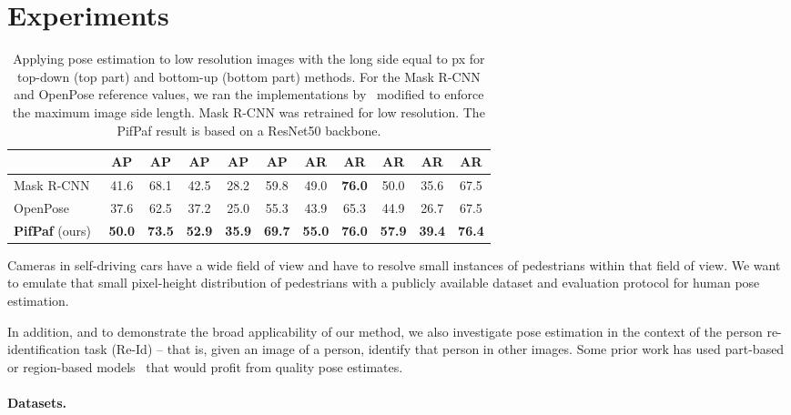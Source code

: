 \documentclass[10pt,twocolumn,letterpaper]{article}
\begin{document}
\section{Experiments}

\begin{table*}
  \centering
  \begin{tabular}{|l|c c c c c|c c c c c|}
    \hline
                           & AP & AP & AP & AP & AP & AR & AR & AR & AR & AR \\
    \hline\hline
    Mask R-CNN~\cite{he2017mask}        & 41.6 & 68.1 & 42.5 & 28.2 & 59.8 & 49.0 & \textbf{76.0} & 50.0 & 35.6 & 67.5 \\
    \hline
    OpenPose~\cite{partsaffinityfields}       & 37.6 & 62.5 & 37.2 & 25.0 & 55.3 & 43.9 & 65.3 & 44.9 & 26.7 & 67.5 \\

    \textbf{PifPaf} (ours)
    & \textbf{50.0} & \textbf{73.5} & \textbf{52.9} & \textbf{35.9} & \textbf{69.7} & \textbf{55.0} & \textbf{76.0} & \textbf{57.9} & \textbf{39.4} & \textbf{76.4} \\
    \hline
  \end{tabular}
  \caption{Applying pose estimation to low resolution images with the long side equal to px for top-down (top part) and bottom-up (bottom part) methods.
           For the Mask R-CNN and OpenPose
           reference values, we ran the implementations by~\cite{tseng2018detectron, 8486591}
           modified to enforce the maximum image side length.
           Mask R-CNN was retrained for low resolution.
           The PifPaf result is based on a ResNet50 backbone.}
  \label{tab:low-res}
\end{table*}

Cameras in self-driving cars have a wide field of view and have to resolve
small instances of pedestrians within that field of view.
We want to emulate that small pixel-height distribution of pedestrians with a
publicly available dataset and evaluation protocol for human pose estimation.

In addition, and to demonstrate the
broad applicability of our method, we also investigate pose estimation in the context of the person re-identification
task (Re-Id) -- that is,
given an image of a person, identify that person in other images.
Some prior work has used part-based or region-based models~\cite{zhao2017spindle,Cheng_2016_CVPR,wu2015viewpoint}
that would profit from quality pose estimates.


\paragraph{Datasets.}
\end{document}
